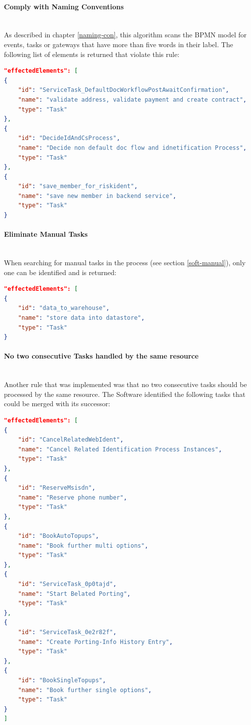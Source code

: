 \paragraph{Comply with Naming Conventions}~\\
As described in chapter \ref{naming-con}, this algorithm scans the BPMN model for events, tasks or gateways that have more than five words in their label. The following list of elements is returned that violate this rule:
\begin{lstlisting}[language=json]
"effectedElements": [
{
	"id": "ServiceTask_DefaultDocWorkflowPostAwaitConfirmation",
	"name": "validate address, validate payment and create contract",
	"type": "Task"
},
{
	"id": "DecideIdAndCsProcess",
	"name": "Decide non default doc flow and idnetification Process",
	"type": "Task"
},
{
	"id": "save_member_for_riskident",
	"name": "save new member in backend service",
	"type": "Task"
}
\end{lstlisting}


\paragraph{Eliminate Manual Tasks}~\\
When searching for manual tasks in the process (see section \ref{soft-manual}), only one can be identified and is returned:
\begin{lstlisting}[language=json]
"effectedElements": [
{
	"id": "data_to_warehouse",
	"name": "store data into datastore",
	"type": "Task"
}
\end{lstlisting}
\paragraph{No two consecutive Tasks handled by the same resource}~\\
Another rule that was implemented was that no two consecutive tasks should be processed by the same resource. The Software identified the following tasks that could be merged with its successor:
\begin{lstlisting}[language=json]
"effectedElements": [
{
	"id": "CancelRelatedWebIdent",
	"name": "Cancel Related Identification Process Instances",
	"type": "Task"
},
{
	"id": "ReserveMsisdn",
	"name": "Reserve phone number",
	"type": "Task"
},
{
	"id": "BookAutoTopups",
	"name": "Book further multi options",
	"type": "Task"
},
{
	"id": "ServiceTask_0p0tajd",
	"name": "Start Belated Porting",
	"type": "Task"
},
{
	"id": "ServiceTask_0e2r82f",
	"name": "Create Porting-Info History Entry",
	"type": "Task"
},
{
	"id": "BookSingleTopups",
	"name": "Book further single options",
	"type": "Task"
}
]
\end{lstlisting}
